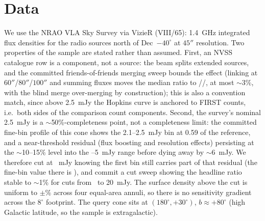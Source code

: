 \documentclass[twocolumn]{aastex631}
\begin{document}
\section{Data}
We use the NRAO VLA Sky Survey \citep{condon1998} via VizieR (VIII/65): 1.4~GHz integrated flux
densities for the radio sources north of Dec~$-40^\circ$ at $45''$ resolution. Two properties of
the sample are stated rather than assumed. First, an NVSS catalogue row is a component,
not a source: the beam splits extended sources, and the committed friends-of-friends merging
sweep bounds the effect (linking at $60''$/$80''$/$100''$ and summing fluxes moves the median
ratio to \scFofSixtyRatio/\scFofEightyRatio/\scFofHundredRatio, at most $\sim$3\%, with the blind merge
over-merging by construction); this is also a convention match, since above 2.5~mJy the Hopkins
curve is anchored to FIRST counts, i.e.\ both sides of the comparison count components. Second,
the survey's nominal 2.5~mJy is a $\sim$50\%-completeness point, not a completeness limit: the
committed fine-bin profile of this cone shows the 2.1--2.5~mJy bin at 0.59 of the reference,
and a near-threshold residual (flux boosting and resolution effects) persisting at the
$\sim$10--15\% level into the \scSmin--5~mJy range before dying away by $\sim$6~mJy. We therefore
cut at \scSmin~mJy knowing the first bin still carries part of that residual
(the fine-bin value there is \scFirstBinResid), and commit a cut sweep showing the headline
ratio stable to $\sim$1\% for cuts from \scSmin\ to 20~mJy. The surface density above the cut is
uniform to $\pm$\scAnnulusSpreadPct\% across four equal-area annuli, so there is no sensitivity
gradient across the $8^\circ$ footprint. The query cone sits at $(180^\circ, +30^\circ)$,
$b\approx+80^\circ$ (high Galactic latitude, so the sample is extragalactic).
\end{document}
